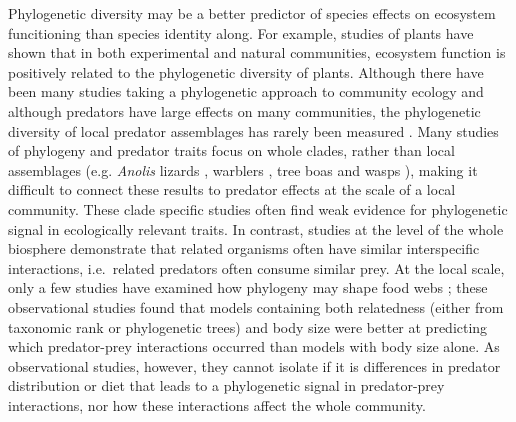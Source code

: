 Phylogenetic diversity may be a better predictor of species effects on ecosystem funcitioning than species identity along. For example, studies of
plants have shown that in both experimental \citep{Cadotte2008} and
natural communities, ecosystem function is
positively related to the phylogenetic diversity of plants. Although
there have been many studies taking a phylogenetic approach to community
ecology and although predators have large effects on many communities,
the phylogenetic diversity of local predator assemblages has rarely been
measured \citep{Bersier2008, Naisbit2011}. Many studies of phylogeny and
predator traits focus on whole clades, rather than local assemblages
(e.g. \emph{Anolis} lizards \citep{Knouft2006}, warblers
\citep{Bohning-Gaese2003}, tree boas \citep{Henderson2013} and wasps
\citep{Udriene2005}), making it difficult to connect these results to
predator effects at the scale of a local community. These clade specific
studies often find weak evidence for phylogenetic signal in ecologically
relevant traits. In contrast, studies at the level of the whole
biosphere \citep{Gomez2010, Bersier2008} demonstrate that related
organisms often have similar interspecific interactions, i.e.~related
predators often consume similar prey. At the local scale, only a few
studies have examined how phylogeny may shape food webs
\citep{Rezende2009, Cagnolo2011}; these observational studies found that
models containing both relatedness (either from taxonomic rank or
phylogenetic trees) and body size were better at predicting which
predator-prey interactions occurred than models with body size alone. As
observational studies, however, they cannot isolate if it is differences
in predator distribution or diet that leads to a phylogenetic signal in
predator-prey interactions, nor how these interactions affect the whole
community.

